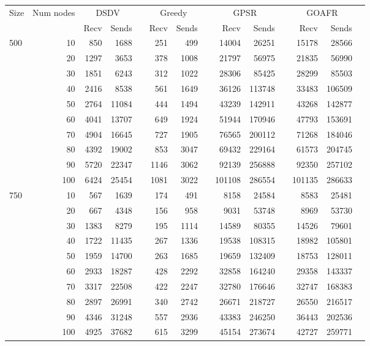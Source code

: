 \begin{tabular}{lrr rr r rr r rr r rr}
Size & Num nodes & \multicolumn{2}{c}{DSDV}&  & \multicolumn{2}{c}{Greedy} & & \multicolumn{2}{c}{GPSR} & & \multicolumn{2}{c}{GOAFR} \\
     &           & Recv      & Sends        &  &   Recv  & Sends             & &    Recv      & Sends      & & Recv   & Sends \\
 \multirow{10}{*}{500} & 10 & 850 & 1688 & & 251 & 499 && 14004 & 26251 && 15178 & 28566 \\
  & 20 & 1297 & 3653 & & 378 & 1008 && 21797 & 56975 && 21835 & 56990 \\
  & 30 & 1851 & 6243 & & 312 & 1022 && 28306 & 85425 && 28299 & 85503 \\
  & 40 & 2416 & 8538 & & 561 & 1649 && 36126 & 113748 && 33483 & 106509 \\
  & 50 & 2764 & 11084 & & 444 & 1494 && 43239 & 142911 && 43268 & 142877 \\
  & 60 & 4041 & 13707 & & 649 & 1924 && 51944 & 170946 && 47793 & 153691 \\
  & 70 & 4904 & 16645 & & 727 & 1905 && 76565 & 200112 && 71268 & 184046 \\
  & 80 & 4392 & 19002 & & 853 & 3047 && 69432 & 229164 && 61573 & 204745 \\
  & 90 & 5720 & 22347 & & 1146 & 3062 && 92139 & 256888 && 92350 & 257102 \\
  & 100 & 6424 & 25454 & & 1081 & 3022 && 101108 & 286554 && 101135 & 286633 \\
\hline
 \multirow{10}{*}{750} & 10 & 567 & 1639 & & 174 & 491 && 8158 & 24584 && 8583 & 25481 \\
  & 20 & 667 & 4348 & & 156 & 958 && 9031 & 53748 && 8969 & 53730 \\
  & 30 & 1383 & 8279 & & 195 & 1114 && 14589 & 80355 && 14526 & 79601 \\
  & 40 & 1722 & 11435 & & 267 & 1336 && 19538 & 108315 && 18982 & 105801 \\
  & 50 & 1959 & 14700 & & 263 & 1685 && 19659 & 132409 && 18753 & 128011 \\
  & 60 & 2933 & 18287 & & 428 & 2292 && 32858 & 164240 && 29358 & 143337 \\
  & 70 & 3317 & 22508 & & 422 & 2247 && 32780 & 176646 && 32747 & 168383 \\
  & 80 & 2897 & 26991 & & 340 & 2742 && 26671 & 218727 && 26550 & 216517 \\
  & 90 & 4346 & 31248 & & 557 & 2936 && 43383 & 246250 && 36443 & 202536 \\
  & 100 & 4925 & 37682 & & 615 & 3299 && 45154 & 273674 && 42727 & 259771 \\
\end{tabular}